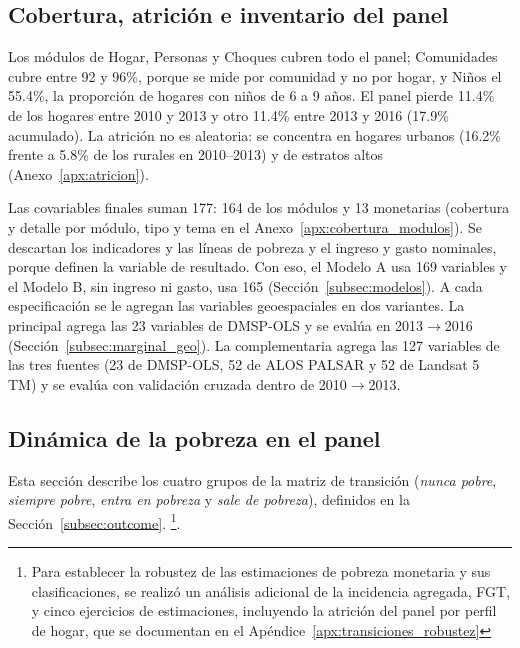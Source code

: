 \documentclass[12pt, letterpaper]{article}
\begin{document}
\subsection{Cobertura, atrición e inventario del panel}
\label{subsec:desc}

Los módulos de Hogar, Personas y Choques cubren todo el panel;
Comunidades cubre entre 92 y 96\%, porque se mide por comunidad y no por
hogar, y Niños el 55.4\%, la proporción de hogares con niños de 6 a 9
años. El panel pierde 11.4\% de los hogares entre 2010 y 2013 y otro
11.4\% entre 2013 y 2016 (17.9\% acumulado). La atrición no es
aleatoria: se concentra en hogares urbanos (16.2\% frente a 5.8\% de los
rurales en 2010--2013) y de estratos altos (Anexo~\ref{apx:atricion}).

Las covariables finales suman 177: 164 de los módulos y 13 monetarias
(cobertura y detalle por módulo, tipo y tema en el
Anexo~\ref{apx:cobertura_modulos}).
\label{subsubsec:variables_especificaciones}
Se descartan los indicadores y las líneas de pobreza y el ingreso y
gasto nominales, porque definen la variable de resultado. Con eso, el
Modelo A usa 169 variables y el Modelo B, sin ingreso ni gasto, usa 165
(Sección~\ref{subsec:modelos}). A cada especificación se le agregan las
variables geoespaciales en dos variantes. La principal agrega las 23
variables de DMSP-OLS y se evalúa en 2013$\to$2016
(Sección~\ref{subsec:marginal_geo}). La complementaria agrega las 127
variables de las tres fuentes (23 de DMSP-OLS, 52 de ALOS PALSAR y 52 de
Landsat 5 TM) y se evalúa con validación cruzada dentro de
2010$\to$2013.

\subsection{Dinámica de la pobreza en el panel}
\label{subsec:transiciones}

Esta sección describe los cuatro grupos de la matriz de transición
(\emph{nunca pobre}, \emph{siempre pobre}, \emph{entra en pobreza} y
\emph{sale de pobreza}), definidos en la Sección~\ref{subsec:outcome}.
\footnote{Para establecer la robustez de las estimaciones de pobreza monetaria y
sus clasificaciones, se realizó un análisis adicional de la incidencia
agregada, FGT, y cinco ejercicios de estimaciones, incluyendo la
atrición del panel por perfil de hogar, que se documentan en el
Apéndice~\ref{apx:transiciones_robustez}}.
\end{document}
